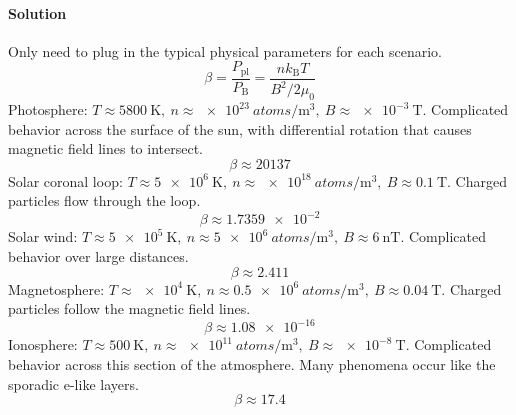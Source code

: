 \documentclass{article}
\begin{document}
		\paragraph{Solution} Only need to plug in the typical physical parameters for each scenario. \\
		\[
			\beta = \frac{P_\mathrm{pl}}{P_\mathrm{B}} = \frac{n k_\mathrm{B} T}{B^2 / 2\mu_0}
		\]
		Photosphere: $ T \approx \qty{5800}{\kelvin},\ n \approx \qty{e23}{atoms\per\meter\cubed},\ B \approx \qty{e-3}{\tesla} $. Complicated behavior across the surface of the sun, with differential rotation that causes magnetic field lines to intersect.
		\[
			\beta \approx \num{20137}
		\]
		Solar coronal loop: $ T \approx \qty{5e6}{\kelvin},\ n \approx \qty{e18}{atoms\per\meter\cubed},\ B \approx \qty{0.1}{\tesla} $. Charged particles flow through the loop.
		\[
			\beta \approx \num{1.7359e-2}
		\]
		Solar wind: $ T \approx \qty{5e5}{\kelvin},\ n \approx \qty{5e6}{atoms\per\meter\cubed},\ B \approx \qty{6}{\nano\tesla} $. Complicated behavior over large distances.
		\[
			\beta \approx \num{2.411}
		\]
		Magnetosphere: $ T \approx \qty{e4}{\kelvin},\ n \approx \qty{0.5e6}{atoms\per\meter\cubed},\ B \approx \qty{0.04}{\tesla} $. Charged particles follow the magnetic field lines.
		\[
			\beta \approx \num{1.08e-16} 
		\]
		Ionosphere: $ T \approx \qty{500}{\kelvin},\ n \approx \qty{e11}{atoms\per\meter\cubed},\ B \approx \qty{e-8}{\tesla} $. Complicated behavior across this section of the atmosphere. Many phenomena occur like the sporadic e-like layers.
		\[
			\beta \approx \num{17.4}
		\]
	
	
	
	\clearpage
	
	
	
\end{document}

